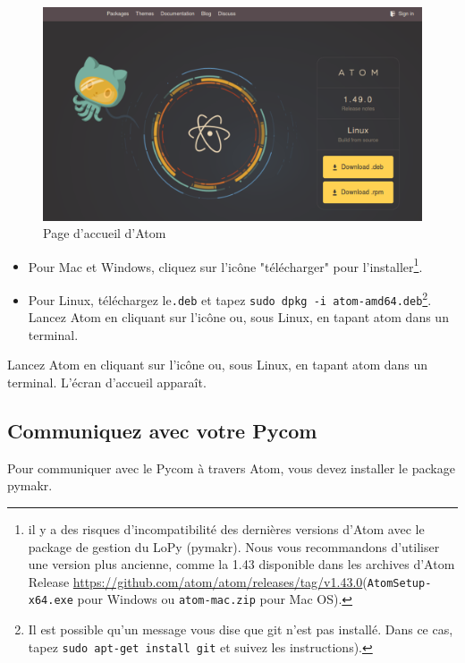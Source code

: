 \begin{figure}[tbp]
\centerline{\includegraphics[width=1\columnwidth]{Pictures/atom_dl.png}}
\caption{Page d'accueil d'Atom}
\label{fig-page-atom}
\end{figure}
\begin{itemize}
\item Pour Mac et Windows, cliquez sur l’icône "télécharger" pour l’installer\footnote{il y a des risques d'incompatibilité des dernières versions d'Atom avec le package de gestion du LoPy (pymakr). Nous vous recommandons d'utiliser une version plus ancienne, comme la 1.43 disponible dans les archives d'Atom Release \url{https://github.com/atom/atom/releases/tag/v1.43.0}(\texttt{AtomSetup-x64.exe} pour Windows ou \texttt{atom-mac.zip} pour Mac OS).}.
\item Pour Linux, téléchargez le\texttt{.deb} et tapez \texttt{sudo dpkg -i atom-amd64.deb}\footnote{Il est possible qu'un message vous dise que git n'est pas installé. Dans ce cas, tapez \texttt{sudo apt-get install git} et suivez les instructions).}.
Lancez Atom en cliquant sur l’icône ou, sous Linux, en tapant atom dans un terminal.
\end{itemize}

     \vspace{1em}

Lancez Atom en cliquant sur l’icône ou, sous Linux, en tapant atom dans un terminal. L’écran d’accueil apparaît.

\subsection{Communiquez avec votre Pycom}

Pour communiquer avec le Pycom à travers Atom, vous devez installer le package pymakr.

